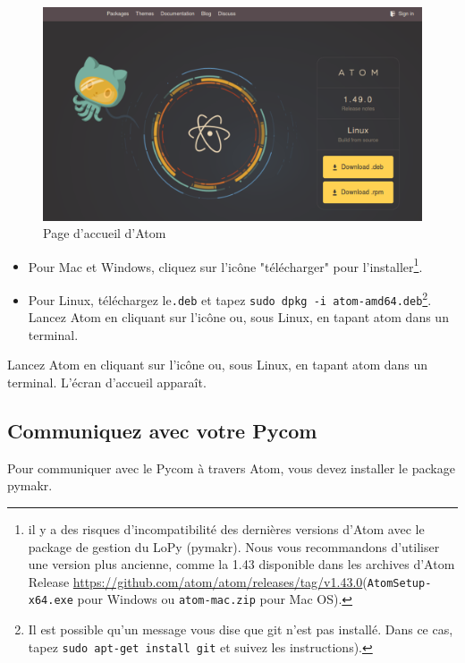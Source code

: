 \begin{figure}[tbp]
\centerline{\includegraphics[width=1\columnwidth]{Pictures/atom_dl.png}}
\caption{Page d'accueil d'Atom}
\label{fig-page-atom}
\end{figure}
\begin{itemize}
\item Pour Mac et Windows, cliquez sur l’icône "télécharger" pour l’installer\footnote{il y a des risques d'incompatibilité des dernières versions d'Atom avec le package de gestion du LoPy (pymakr). Nous vous recommandons d'utiliser une version plus ancienne, comme la 1.43 disponible dans les archives d'Atom Release \url{https://github.com/atom/atom/releases/tag/v1.43.0}(\texttt{AtomSetup-x64.exe} pour Windows ou \texttt{atom-mac.zip} pour Mac OS).}.
\item Pour Linux, téléchargez le\texttt{.deb} et tapez \texttt{sudo dpkg -i atom-amd64.deb}\footnote{Il est possible qu'un message vous dise que git n'est pas installé. Dans ce cas, tapez \texttt{sudo apt-get install git} et suivez les instructions).}.
Lancez Atom en cliquant sur l’icône ou, sous Linux, en tapant atom dans un terminal.
\end{itemize}

     \vspace{1em}

Lancez Atom en cliquant sur l’icône ou, sous Linux, en tapant atom dans un terminal. L’écran d’accueil apparaît.

\subsection{Communiquez avec votre Pycom}

Pour communiquer avec le Pycom à travers Atom, vous devez installer le package pymakr.

